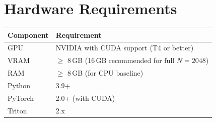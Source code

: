 \section*{Hardware Requirements}

\begin{table}[H]
    \centering
    \begin{tabular}{@{} l l @{}}
        \toprule
        \textbf{Component} & \textbf{Requirement} \\
        \midrule
        GPU      & NVIDIA with CUDA support (T4 or better) \\
        VRAM     & $\geq$ 8\,GB (16\,GB recommended for full $N = 2048$) \\
        RAM      & $\geq$ 8\,GB (for CPU baseline) \\
        Python   & 3.9+ \\
        PyTorch  & 2.0+ (with CUDA) \\
        Triton   & 2.x \\
        \bottomrule
    \end{tabular}
\end{table}
